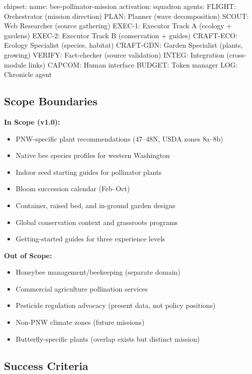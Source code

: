 \documentclass[11pt,letterpaper]{article}
\begin{document}
\begin{asciibox}
chipset:
  name: bee-pollinator-mission
  activation: squadron
  agents:
    FLIGHT:    Orchestrator (mission direction)
    PLAN:      Planner (wave decomposition)
    SCOUT:     Web Researcher (source gathering)
    EXEC-1:    Executor Track A (ecology + gardens)
    EXEC-2:    Executor Track B (conservation + guides)
    CRAFT-ECO: Ecology Specialist (species, habitat)
    CRAFT-GDN: Garden Specialist (plants, growing)
    VERIFY:    Fact-checker (source validation)
    INTEG:     Integration (cross-module links)
    CAPCOM:    Human interface
    BUDGET:    Token manager
    LOG:       Chronicle agent
\end{asciibox}

\subsection{Scope Boundaries}

\textbf{In Scope (v1.0):}
\begin{itemize}[nosep]
  \item PNW-specific plant recommendations (47--48\textdegree N, USDA zones 8a--8b)
  \item Native bee species profiles for western Washington
  \item Indoor seed starting guides for pollinator plants
  \item Bloom succession calendar (Feb--Oct)
  \item Container, raised bed, and in-ground garden designs
  \item Global conservation context and grassroots programs
  \item Getting-started guides for three experience levels
\end{itemize}

\textbf{Out of Scope:}
\begin{itemize}[nosep]
  \item Honeybee management/beekeeping (separate domain)
  \item Commercial agriculture pollination services
  \item Pesticide regulation advocacy (present data, not policy positions)
  \item Non-PNW climate zones (future missions)
  \item Butterfly-specific plants (overlap exists but distinct mission)
\end{itemize}

\subsection{Success Criteria}
\end{document}
